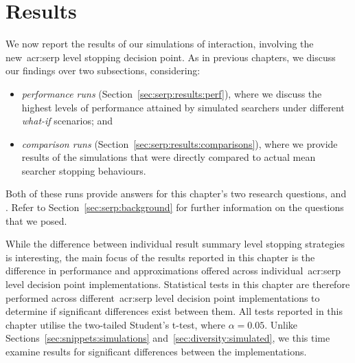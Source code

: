 \section{Results}\label{sec:serp:results}
We now report the results of our simulations of interaction, involving the new~\gls{acr:serp} level stopping decision point. As in previous chapters, we discuss our findings over two subsections, considering:

\begin{itemize}
    \item{\emph{performance runs} (Section~\ref{sec:serp:results:perf}), where we discuss the highest levels of performance attained by simulated searchers under different \emph{what-if} scenarios; and}
    \item{\emph{comparison runs} (Section~\ref{sec:serp:results:comparisons}), where we provide results of the simulations that were directly compared to actual mean searcher stopping behaviours.}
\end{itemize}

Both of these runs provide answers for this chapter's two research questions,  and . Refer to Section~\ref{sec:serp:background} for further information on the questions that we posed.

While the difference between individual result summary level stopping strategies is interesting, the main focus of the results reported in this chapter is the difference in performance and approximations offered across individual~\gls{acr:serp} level decision point implementations. Statistical tests in this chapter are therefore performed across different~\gls{acr:serp} level decision point implementations to determine if significant differences exist between them. All tests reported in this chapter utilise the two-tailed Student's t-test, where $\alpha=0.05$. Unlike Sections~\ref{sec:snippets:simulations} and~\ref{sec:diversity:simulated}, we this time examine results for significant differences between the implementations.


